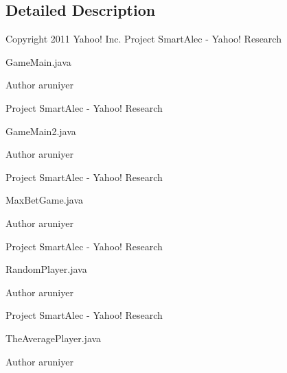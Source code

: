 \subsection{Detailed Description}
Copyright 2011 Yahoo! Inc. Project SmartAlec -\/ Yahoo! Research

GameMain.java

\begin{DoxyAuthor}{Author}
aruniyer
\end{DoxyAuthor}
Project SmartAlec -\/ Yahoo! Research

GameMain2.java

\begin{DoxyAuthor}{Author}
aruniyer
\end{DoxyAuthor}
Project SmartAlec -\/ Yahoo! Research

\-M\-a\-x\-B\-e\-t\-G\-a\-m\-e\-.\-j\-a\-v\-a

\begin{DoxyAuthor}{Author}
aruniyer
\end{DoxyAuthor}
Project SmartAlec -\/ Yahoo! Research

RandomPlayer.java

\begin{DoxyAuthor}{Author}
aruniyer
\end{DoxyAuthor}
Project SmartAlec -\/ Yahoo! Research

\-T\-h\-e\-A\-v\-e\-r\-a\-g\-e\-P\-l\-a\-y\-e\-r\-.\-j\-a\-v\-a

\begin{DoxyAuthor}{Author}
aruniyer 
\end{DoxyAuthor}
